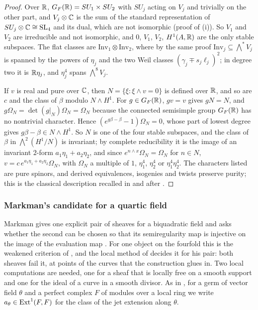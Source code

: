 \begin{proof}
Over $\mathbb{R}$, $G_{F}(\mathbb{R})=SU_{1}\times SU_{2}$ with $SU_{j}$ acting on $V_{j}$
and trivially on the other part, and $V_{j}\otimes\mathbb{C}$ is the sum of the
standard representation of $SU_{j}\otimes\mathbb{C}\cong\operatorname{SL}_{4}$ and its dual, which
are not isomorphic (proof of (i)). So $V_{1}$ and
$V_{2}$ are irreducible and not isomorphic, and $0$, $V_{1}$, $V_{2}$,
$H^{1}(A,\mathbb{R})$ are the only stable subspaces. The flat classes are
$\mathrm{Inv}_{1}\otimes\mathrm{Inv}_{2}$, where by the same proof
$\mathrm{Inv}_{j}\subseteq\bigwedge^{*}V_{j}$ is spanned by the powers of
$\eta_{j}$ and the two Weil classes $(\gamma_{j}\mp s_{j}\ell_{j})^{2}$; in
degree two it is $\mathbb{R}\eta_{j}$, and $\eta_{j}^{4}$ spans $\bigwedge^{8}V_{j}$.

If $v$ is real and pure over $\mathbb{C}$, then $N=\{\xi:\xi\wedge v=0\}$ is
defined over $\mathbb{R}$, and so are $c$ and the class of $\beta$ modulo
$N\wedge H^{1}$. For $g\in G_{F}(\mathbb{R})$, $gv=v$ gives $gN=N$, and
$g\Omega_{N}=\det(g|_{N})\Omega_{N}=\Omega_{N}$ because the connected
semisimple group $G_{F}(\mathbb{R})$ has no nontrivial character. Hence
$(e^{g\beta-\beta}-1)\Omega_{N}=0$, whose part of lowest degree gives
$g\beta-\beta\in N\wedge H^{1}$. So $N$ is one of the four stable subspaces,
and the class of $\beta$ in $\bigwedge^{2}(H^{1}/N)$ is invariant; by complete
reducibility it is the image of an invariant $2$-form
$a_{1}\eta_{1}+a_{2}\eta_{2}$, and since $e^{n\wedge x}\Omega_{N}=\Omega_{N}$
for $n\in N$, $v=c\,e^{a_{1}\eta_{1}+a_{2}\eta_{2}}\Omega_{N}$, with
$\Omega_{N}$ a multiple of $1$, $\eta_{1}^{4}$, $\eta_{2}^{4}$ or
$\eta_{1}^{4}\eta_{2}^{4}$. The characters listed are pure spinors, and
derived equivalences, isogenies and twists preserve purity; this is the
classical description recalled in  and after
.
\end{proof}

\subsubsection*{Markman's candidate for a quartic field}

Markman gives one explicit pair of sheaves for a biquadratic field
\cite[Example~11.2.7, Lemma~11.2.8]{Mar25c} and asks whether the second can
be chosen so that its semiregularity map is injective on the image of the
evaluation map \cite[Question~11.2.2]{Mar25c}. For one object on the fourfold
this is the weakened criterion of , and the local
method of  decides it for his pair: both sheaves
fail it, at points of the curves that the construction glues in. Two local
computations are needed, one for a sheaf that is locally free on a smooth
support and one for the ideal of a curve in a smooth divisor. As in
, for a germ of vector field $\theta$ and a perfect
complex $F$ of modules over a local ring we write
$a_{\theta}\in\operatorname{Ext}^{1}(F,F)$ for the class of the jet extension along
$\theta$.


